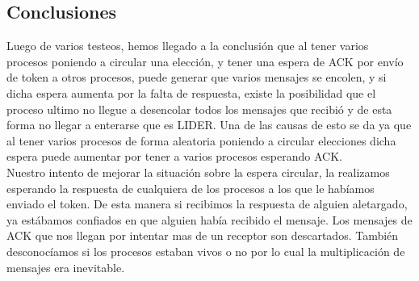 
\subsection{Conclusiones}

Luego de varios testeos, hemos llegado a la conclusión que al tener varios procesos poniendo a circular una elección, y tener una espera de ACK por envío de token a otros procesos, puede generar que varios mensajes se encolen, y si dicha espera aumenta por la falta de respuesta, existe la posibilidad que el proceso ultimo no llegue a desencolar todos los mensajes que recibió y de esta forma no llegar a enterarse que es LIDER. Una de las causas de esto se da ya que al  tener varios procesos de forma aleatoria poniendo a circular elecciones dicha espera puede aumentar por tener a varios procesos esperando ACK.\\

Nuestro intento de mejorar la situación sobre la espera circular, la realizamos esperando la respuesta de cualquiera de los procesos a los que le habíamos enviado el token. De esta manera si recibimos la respuesta de alguien aletargado, ya estábamos confiados en que alguien había recibido el mensaje. Los mensajes de ACK que nos llegan por intentar mas de un receptor son descartados. También desconocíamos si los procesos estaban vivos o no por lo cual la multiplicación de mensajes era inevitable.\\
